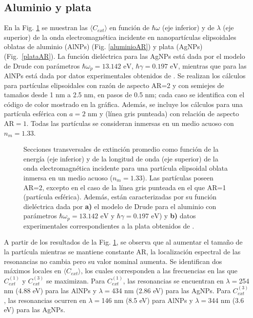 \subsection*{Aluminio y plata}
En la Fig. \ref{aluminioplataAR} se muestran las $\langle C_{ext}\rangle$ en función de $\hbar\omega$ (eje inferior) y de  $\lambda$ (eje superior) de la onda electromagnética incidente en nanopartículas elipsoidales oblatas de aluminio (AlNPs) (Fig. \ref{aluminioAR}) y plata (AgNPs) (Fig.~\ref{plataAR}). La función dieléctrica para las AgNPs está dada por el modelo de Drude con parámetros $\hbar\omega_p=13.142\text{ eV}$, $\hbar\gamma=0.197\text{ eV}$, mientras que para las AlNPs  está dada por datos experimentales obtenidos de \cite{Plata}. Se realizan los cálculos para partículas elipsoidales con razón de aspecto AR=2 y con semiejes de tamaños desde 1 nm a 2.5 nm, en pasos de 0.5 nm; cada caso se identifica con el código de color mostrado en la gráfica. Además, se incluye los cálculos para una partícula esférica con $a=2 \text{ nm}$ y (línea gris punteada) con relación de aspecto AR$=1$. Todas las partículas se consideran inmersas en un medio acuoso con $n_m=1.33$.\\

\begin{figure}[h!]
	\quad%
	\caption{Secciones transversales de extinción promedio como función de la energía (eje inferior) y de la longitud de onda (eje superior) de la onda electromagnética incidente para una partícula elipsoidal oblata inmersa en un medio acuoso ($n_m=1.33$). Las partículas poseen AR=2, excepto en el caso de la línea gris punteada en el que AR=1 (partícula esférica). Además, están caracterizadas por su función dieléctrica dada por  \textbf{a)} el modelo de Drude para el aluminio con parámetros $\hbar\omega_p=13.142\text{ eV}$ y $\hbar\gamma=0.197\text{ eV}$) y \textbf{b)} datos experimentales correspondientes a la plata obtenidos de \cite{Plata}. }\label{aluminioplataAR}
\end{figure}
A partir de los resultados de la Fig. \ref{aluminioplataAR}, se observa que al aumentar el tamaño de la partícula mientras se mantiene constante AR, la localización espectral de las resonancias no cambia pero su valor nominal aumenta. Se identifican dos máximos locales en $\langle C_{ext}\rangle$,  los cuales corresponden a las frecuencias en las que $C_{ext}^{(1)}$ y $C_{ext}^{(3)}$ se maximizan. Para $C_{ext}^{(1)}$, las resonancias  se encuentran en $\lambda=$254 nm (4.88 eV) para las AlNPs y $\lambda=$434 nm (2.86 eV) para las AgNPs. Para $C_{ext}^{(3)}$, las resonancias ocurren en $\lambda=$146 nm (8.5 eV) para AlNPs y $\lambda=$344 nm (3.6 eV) para las AgNPs. \\

